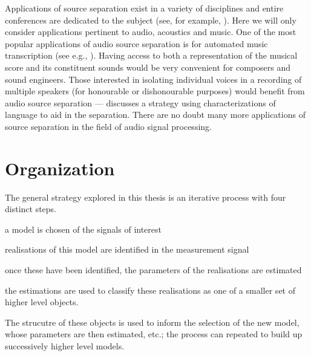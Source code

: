 Applications of source separation exist in a variety of disciplines and entire
conferences are dedicated to the subject (see, for example,
\cite{zarzoso2010latent}).  Here we will only consider applications pertinent to
audio, acoustics and music. One of the most popular applications of audio source
separation is for automated music transcription (see e.g.,
\cite{bertin2010enforcing}). Having access to both a representation of the
musical score and its constituent sounds would be very convenient for composers
and sound engineers. Those interested in isolating individual voices in a
recording of multiple speakers (for honourable or dishonourable purposes) would
benefit from audio source separation --- \cite{mysore2012non} discusses a
strategy using characterizations of language to aid in the separation. There are
no doubt many more applications of source separation in the field of audio
signal processing.

\section{Organization}

The general strategy explored in this thesis is an iterative process with four
distinct steps.
\begin{enumerate*}[label=(\arabic*),itemjoin={{. }}]
\item a model is chosen of the signals of interest
\item realisations of this model are
identified in the measurement signal
\item once these have been identified, the parameters
of the realisations are estimated
\item the estimations are used to classify these
realisations as one of a smaller set of higher level objects.
\end{enumerate*}
The strucutre of these objects is used to inform the selection of the new model,
whose parameters are then estimated, etc.; the process can repeated to build
up successively higher level models.

